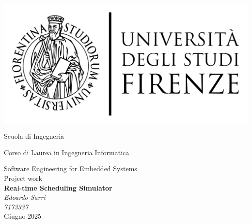 \newcommand{\scuola}{
	{\fontsize{18pt}{\baselineskip}\selectfont Scuola di Ingegneria}}
\newcommand{\corso}{
    {\fontsize{16pt}{\baselineskip}\selectfont Corso di Laurea in Ingegneria Informatica}}
\newcommand{\lezione}{
	{\fontsize{14pt}{\baselineskip}\selectfont Software Engineering for Embedded Systems \\ Project work}}

\begin{titlepage}
    \centering
    \vspace{1cm}
    \includegraphics[scale=0.3]{immagini/logo UniFi.pdf} \\
    \vspace{1cm}
    \scuola \\
    \vspace{0.5cm}
    \corso \\
    \vspace{0.5cm}
    \lezione \\
    \vspace{4cm}
    {\Huge\bfseries Real-time Scheduling Simulator} \\
    \vspace{2cm}
    {\Large\itshape Edoardo Sarri} \\
    \vspace{0.5cm}
    {\Large\itshape 7173337} \\
    \vfill
    {\fontsize{16pt}{\baselineskip}\selectfont Giugno 2025}
\end{titlepage}